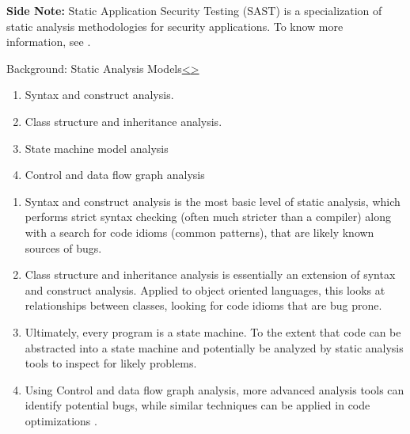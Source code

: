 \documentclass[12pt]{extarticle}
\newenvironment{instructionblock}{\Large\bgroup}{\egroup}
\begin{document}
\vspace{4mm}
\noindent
\textbf{Side Note:} Static Application Security Testing (SAST) is a specialization of static analysis methodologies for security applications. To know more information, see \cite{SAST}.





\pagebreak
\begin{slide}{Background: Static Analysis Models}{\hyperref[slide 8]{\textless}\hyperref[slide 10]{\textgreater}}
	\vskip 10pt
	\begin{instructionblock}
	\begin{enumerate}
	\item Syntax and construct analysis\cite{FindingBugsisEasy}.
	\item Class structure and inheritance analysis\cite{StaticAnalysisTools}.
	\item State machine model analysis\cite{StaticAnalysisTools}
	\item Control and data flow graph analysis\cite{StaticAnalysisTools}
	\end{enumerate}

	\end{instructionblock}
\end{slide}
	\begin{enumerate}
	\item Syntax and construct analysis is the most basic level of static analysis, which performs strict syntax checking (often much stricter than a compiler) along with a search for code idioms (common patterns), that are likely known sources of bugs\cite{FindingBugsisEasy}.
	\item Class structure and inheritance analysis is essentially an extension of syntax and construct analysis.  Applied to object oriented languages, this looks at relationships between classes, looking for code idioms that are bug prone\cite{StaticAnalysisTools}.
	\item Ultimately, every program is a state machine.  To the extent that code can be abstracted into a state machine and potentially be analyzed by static analysis tools to inspect for likely problems\cite{MappingofStateMachines}.
	\item Using Control and data flow graph analysis, more advanced analysis tools can identify potential bugs, while similar techniques can be applied in code optimizations
	\cite{WikipediaControl_flow_graph}\cite{WikipediaData-flow_analysis}.
	\end{enumerate}
\end{document}
